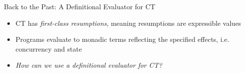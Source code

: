 \documentclass{beamer}
\begin{document}
\begin{frame}{Back to the Past: A Definitional Evaluator for CT}


\bigskip


\bigskip

\begin{itemize}

  \item{CT has \emph{first-class resumptions}, meaning resumptions are expressible values}
  \item{Programs evaluate to monadic terms reflecting the specified effects, i.e. concurrency and state}
    
  \item{\emph{How can we use a definitional evaluator for CT?}}

\end{itemize}


\end{frame}
\end{document}
